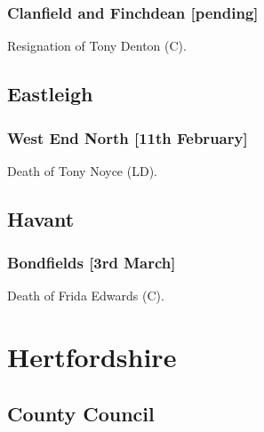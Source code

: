 \documentclass[a4paper,openany]{book}
\begin{document}
\begin{resultsiii}
\subsubsection*{Clanfield and Finchdean \hspace*{\fill}\nolinebreak[1]%
\enspace\hspace*{\fill}
[pending]}


Resignation of Tony Denton (C).

\subsection*{Eastleigh}

\subsubsection*{West End North \hspace*{\fill}\nolinebreak[1]%
\enspace\hspace*{\fill}
[11th February]}


Death of Tony Noyce (LD).
 
\subsection*{Havant}

\subsubsection*{Bondfields \hspace*{\fill}\nolinebreak[1]%
\enspace\hspace*{\fill}
[3rd March]}


Death of Frida Edwards (C).
 
\section{Hertfordshire}

\subsection*{County Council}


\end{resultsiii}
\end{document}
